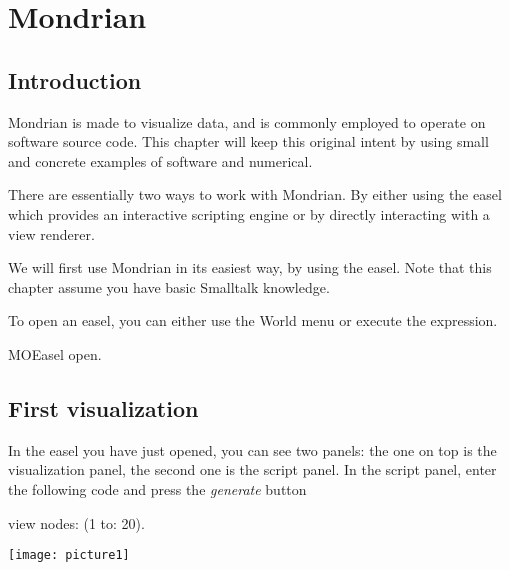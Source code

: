 \documentclass[a4paper,10pt,twoside]{book}
\begin{document}
\fi
\sloppy
\chapter{Mondrian}
\chapterauthor{\authoralex{}}


\section{Introduction}
Mondrian is made to visualize data, and is commonly employed to operate on software source code. This chapter will keep this original intent by using small and concrete examples of software and numerical.

There are essentially two ways to work with Mondrian. By either using the easel which provides an interactive scripting engine or by directly interacting with a view renderer. 

We will first use Mondrian in its easiest way, by using the easel. Note that this chapter assume you have basic Smalltalk knowledge.

To open an easel, you can either use the World menu or execute the expression.


\begin{code}{}
MOEasel open.
\end{code}

\section{First visualization}
In the easel you have just opened, you can see two panels: the one on top is the visualization panel, the second one is the script panel. In the script panel, enter the following code and press the \emph{generate} button

\begin{code}{}
view nodes: (1 to: 20).
\end{code}
\begin{center}\texttt{[image: picture1]}\end{center}
\end{document}
